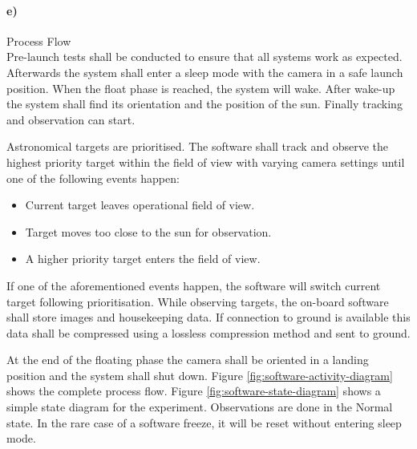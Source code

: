 \paragraph{e)} Process Flow\\

Pre-launch tests shall be conducted to ensure that all systems work as expected. Afterwards the system shall enter a sleep mode with the camera in a safe launch position. When the float phase is reached, the system will wake. After wake-up the system shall find its orientation and the position of the sun. Finally tracking and observation can start.

Astronomical targets are prioritised. The software shall track and observe the highest priority target within the field of view with varying camera settings until one of the following events happen:

\begin{itemize}
	\item Current target leaves operational field of view.
	\item Target moves too close to the sun for observation.
	\item A higher priority target enters the field of view.
\end{itemize}

If one of the aforementioned events happen, the software will switch current target following prioritisation. While observing targets, the on-board software shall store images and housekeeping data. If connection to ground is available this data shall be compressed using a lossless compression method and sent to ground.

At the end of the floating phase the camera shall be oriented in a landing position and the system shall shut down. Figure \ref{fig:software-activity-diagram} shows the complete process flow. Figure \ref{fig:software-state-diagram} shows a simple state diagram for the experiment. Observations are done in the Normal state. In the rare case of a software freeze, it will be reset without entering sleep mode. 

